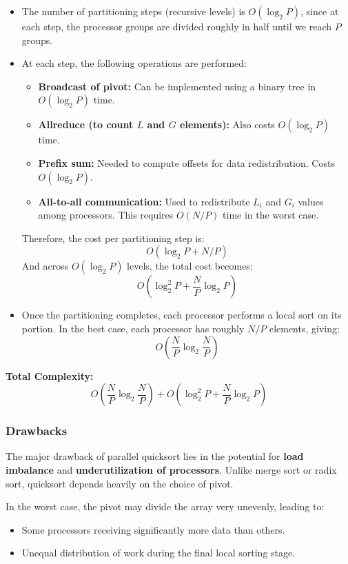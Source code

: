 \documentclass[12pt]{book}
\begin{document}
\begin{itemize}
    \item The number of partitioning steps (recursive levels) is $O(\log_2 P)$, since at each step, the processor groups are divided roughly in half until we reach $P$ groups.
    
    \item At each step, the following operations are performed:
    \begin{itemize}
        \item \textbf{Broadcast of pivot:} Can be implemented using a binary tree in $O(\log_2 P)$ time.
        \item \textbf{Allreduce (to count $L$ and $G$ elements):} Also costs $O(\log_2 P)$ time.
        \item \textbf{Prefix sum:} Needed to compute offsets for data redistribution. Costs $O(\log_2 P)$.
        \item \textbf{All-to-all communication:} Used to redistribute $L_i$ and $G_i$ values among processors. This requires $O(N/P)$ time in the worst case.
    \end{itemize}
    
    Therefore, the cost per partitioning step is:
    \[
    O(\log_2 P + N/P)
    \]
    And across $O(\log_2 P)$ levels, the total cost becomes:
    \[
    O(\log_2^2 P + \frac{N}{P} \log_2 P)
    \]
    
    \item Once the partitioning completes, each processor performs a local sort on its portion. In the best case, each processor has roughly $N/P$ elements, giving:
    \[
    O\left(\frac{N}{P} \log_2 \frac{N}{P}\right)
    \]
\end{itemize}

\textbf{Total Complexity:}
\[
O\left(\frac{N}{P} \log_2 \frac{N}{P}\right) + O\left(\log_2^2 P + \frac{N}{P} \log_2 P\right)
\]

\subsubsection*{Drawbacks}

The major drawback of parallel quicksort lies in the potential for \textbf{load imbalance} and \textbf{underutilization of processors}. Unlike merge sort or radix sort, quicksort depends heavily on the choice of pivot.

In the worst case, the pivot may divide the array very unevenly, leading to:
\begin{itemize}
    \item Some processors receiving significantly more data than others.
    \item Unequal distribution of work during the final local sorting stage.
\end{itemize}
\end{document}
